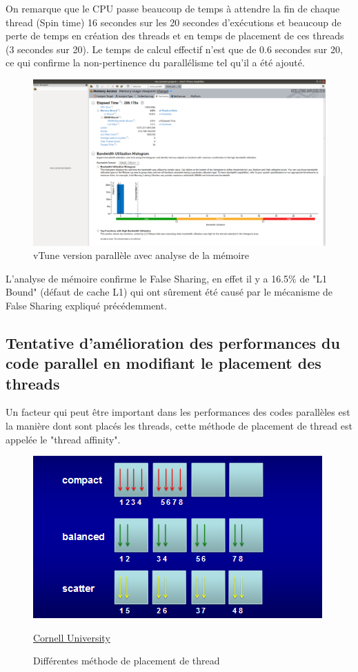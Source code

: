 \documentclass[
 aip,
 jmp,
 amsmath,amssymb,
 reprint
]{revtex4-1}
\begin{document}
On remarque que le CPU passe beaucoup de temps à attendre la fin de chaque thread (Spin time) 16 secondes sur les 20 secondes d'exécutions et beaucoup de perte de temps en création des threads et en temps de placement de ces threads (3 secondes sur 20). Le temps de calcul effectif n'est que de 0.6 secondes sur 20, ce qui confirme la non-pertinence du parallélisme tel qu'il a été ajouté.

\begin{figure}[H]
  \includegraphics[width=\linewidth, keepaspectratio=true]{vtune_parallel_memory.png}
  \centering
  \caption{vTune version parallèle avec analyse de la mémoire\label{Fig:vtune_mem_use}}
\end{figure}

L'analyse de mémoire confirme le False Sharing, en effet il y a 16.5\% de "L1 Bound" (défaut de cache L1) qui ont sûrement été causé par le mécanisme de False Sharing expliqué précédemment.

\subsection{Tentative d'amélioration des performances du code parallel en modifiant le placement des threads}

Un facteur qui peut être important dans les performances des codes parallèles est la manière dont sont placés les threads, cette méthode de placement de thread est appelée le "thread affinity".

\begin{figure}[H]
  \includegraphics[width=\linewidth, keepaspectratio=true]{affinity.png}
  \centering
  \caption{Différentes méthode de placement de thread \label{Fig:affinity}}{\href{https://cvw.cac.cornell.edu/mic/affinity}{Cornell University}}
\end{figure}
\end{document}
